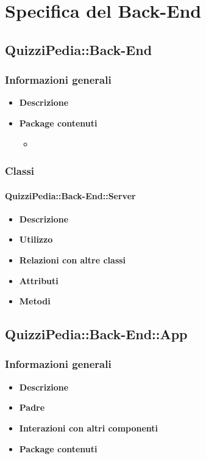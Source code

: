 \newpage
\section{Specifica del Back-End}
\subsection{QuizziPedia::Back-End}
\subsubsection{Informazioni generali}
	\begin{itemize}
		\item \textbf{Descrizione} \\
		\item \textbf{Package contenuti} \\
		\begin{itemize}
			\item 
		\end{itemize}
	\end{itemize}
\subsubsection{Classi}
	\paragraph{QuizziPedia::Back-End::Server}
	\begin{itemize}
		\item \textbf{Descrizione}
		\item \textbf{Utilizzo}
		\item \textbf{Relazioni con altre classi}
		\item \textbf{Attributi}
		\item \textbf{Metodi}
	\end{itemize}
	
\subsection{QuizziPedia::Back-End::App}
\subsubsection{Informazioni generali}
	\begin{itemize}
		\item \textbf{Descrizione} \\
		\item \textbf{Padre} \\
		\item \textbf{Interazioni con altri componenti} \\
		\item \textbf{Package contenuti}
	\end{itemize}
	
